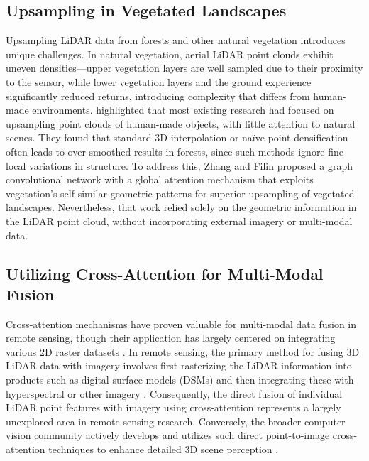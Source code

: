 \documentclass[12pt]{report}
\begin{document}
\subsection{Upsampling in Vegetated Landscapes}

Upsampling LiDAR data from forests and other natural vegetation introduces unique challenges. In natural vegetation, aerial LiDAR point clouds exhibit uneven densities—upper vegetation layers are well sampled due to their proximity to the sensor, while lower vegetation layers and the ground experience significantly reduced returns, introducing complexity that differs from human-made environments. \citet{zhang2022deep} highlighted that most existing research had focused on upsampling point clouds of human-made objects, with little attention to natural scenes. They found that standard 3D interpolation or naïve point densification often leads to over-smoothed results in forests, since such methods ignore fine local variations in structure. To address this, Zhang and Filin proposed a graph convolutional network with a global attention mechanism that exploits vegetation's self-similar geometric patterns for superior upsampling of vegetated landscapes. Nevertheless, that work relied solely on the geometric information in the LiDAR point cloud, without incorporating external imagery or multi-modal data.

\subsection{Utilizing Cross-Attention for Multi-Modal Fusion}

Cross-attention mechanisms have proven valuable for multi-modal data fusion in remote sensing, though their application has largely centered on integrating various 2D raster datasets \citep{yan2025remote, ma2022crossmodal, qingyun2022cross, li2024cross}. In remote sensing, the primary method for fusing 3D LiDAR data with imagery involves first rasterizing the LiDAR information into products such as digital surface models (DSMs) and then integrating these with hyperspectral or other imagery \citep{yu2024dmsca, li2024multi, yang2024lidar}. Consequently, the direct fusion of individual LiDAR point features with imagery using cross-attention represents a largely unexplored area in remote sensing research. Conversely, the broader computer vision community actively develops and utilizes such direct point-to-image cross-attention techniques to enhance detailed 3D scene perception \citep{zhu2024cams, yoo20203d, wu2021point}.
\end{document}
